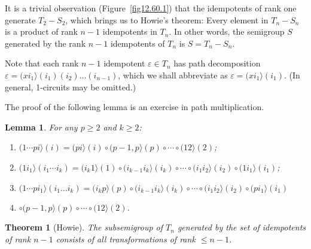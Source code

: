 \documentclass{surv-l}
\numberwithin{equation}{section}
\numberwithin{table}{section}
\numberwithin{figure}{section}
\theoremstyle{plain}
\newtheorem{theorem}[equation]{Theorem}
\newtheorem{lemma}[equation]{Lemma}
\theoremstyle{definition}
\begin{document}
It is a trivial observation (Figure~\ref{fig12.60.1}) that the
idempotents of rank one generate $T_{2}-S_{2}$, which brings us to
Howie's theorem: Every element in $T_{n}-S_{n}$ is a product of
rank $n-1$ idempotents in $T_{n}$. In other words, the semigroup
$S$ generated by the rank $n-1$ idempotents of $T_{n}$ is
$S=T_{n}-S_{n}$.

Note that each rank $n-1$ idempotent $\varepsilon\in T_{n}$ has path
decomposition $\varepsilon=(xi_{1}\rangle(i_{1})(i_{2})\ldots
(i_{n-1})$, which we shall abbreviate as
$\varepsilon=(xi_{1}\rangle (i_{1})$. (In general, 1-circuits may
be omitted.)

The proof of the following lemma is an exercise in path
multiplication.

\setcounter{equation}{1}
\begin{lemma}\label{lem12.60.2}
\emph{For any} $p\geq 2$ \emph{and} $k\geq 2$:
\begin{enumerate}
\item[(1)]\quad $(1\cdots pi\rangle(i)=(pi\rangle(i)\circ(p-1,p\rangle(p)\circ\cdots
\circ (12\rangle (2)$;

\item[(2)]\quad $(1i_{1}\rangle(i_{1}\cdots
i_{k})=(i_{k}1\rangle(1)\circ(i_{k-1}i_{k}\rangle(i_{k})\circ\cdots\circ
(i_{1}i_{2}\rangle(i_{2})\circ(1i_{1}\rangle (i_{1})$;

\item[(3)]\quad $(1\cdots pi_{1}\rangle (i_{1}\ldots
i_{k})=(i_{k}p\rangle(p)\circ(i_{k-1}i_{k}\rangle(i_{k})\circ\cdots
\circ (i_{1}i_{2}\rangle(i_{2})\circ(pi_{1}\rangle(i_{1})$
\item[] \qquad\qquad\qquad\qquad\qquad\qquad$\circ(p-1,p\rangle(p)\circ\cdots \circ (12\rangle(2)$.
\end{enumerate}
\end{lemma}

\begin{theorem}[Howie]\label{thm12.60.3}
The subsemigroup of $T_{n}$ generated by the set of
idempotents of rank $n-1$ consists of all transformations of
rank $\leq n -1$.
\end{theorem}
\end{document}
